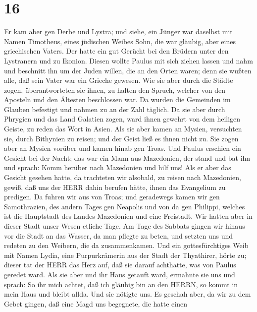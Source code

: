 \hypertarget{section-15}{%
\section{16}\label{section-15}}

 Er kam aber gen Derbe und Lystra; und siehe, ein Jünger war
daselbst mit Namen Timotheus, eines jüdischen Weibes Sohn, die war
gläubig, aber eines griechischen Vaters.  Der hatte ein gut
Gerücht bei den Brüdern unter den Lystranern und zu Ikonion.
 Diesen wollte Paulus mit sich ziehen lassen und nahm und
beschnitt ihn um der Juden willen, die an den Orten waren; denn sie
wußten alle, daß sein Vater war ein Grieche gewesen.  Wie
sie aber durch die Städte zogen, überantworteten sie ihnen, zu halten
den Spruch, welcher von den Aposteln und den Ältesten beschlossen war.
 Da wurden die Gemeinden im Glauben befestigt und nahmen zu
an der Zahl täglich.  Da sie aber durch Phrygien und das
Land Galatien zogen, ward ihnen gewehrt von dem heiligen Geiste, zu
reden das Wort in Asien.  Als sie aber kamen an Mysien,
versuchten sie, durch Bithynien zu reisen; und der Geist ließ es ihnen
nicht zu.  Sie zogen aber an Mysien vorüber und kamen hinab
gen Troas.  Und Paulus erschien ein Gesicht bei der Nacht;
das war ein Mann aus Mazedonien, der stand und bat ihn und sprach: Komm
herüber nach Mazedonien und hilf uns!  Als er aber das
Gesicht gesehen hatte, da trachteten wir alsobald, zu reisen nach
Mazedonien, gewiß, daß uns der HERR dahin berufen hätte, ihnen das
Evangelium zu predigen.  Da fuhren wir aus von Troas; und
geradewegs kamen wir gen Samothrazien, des andern Tages gen Neapolis
 und von da gen Philippi, welches ist die Hauptstadt des
Landes Mazedonien und eine Freistadt. Wir hatten aber in dieser Stadt
unser Wesen etliche Tage.  Am Tage des Sabbats gingen wir
hinaus vor die Stadt an das Wasser, da man pflegte zu beten, und setzten
uns und redeten zu den Weibern, die da zusammenkamen.  Und
ein gottesfürchtiges Weib mit Namen Lydia, eine Purpurkrämerin aus der
Stadt der Thyathirer, hörte zu; dieser tat der HERR das Herz auf, daß
sie darauf achthatte, was von Paulus geredet ward.  Als sie
aber und ihr Haus getauft ward, ermahnte sie uns und sprach: So ihr mich
achtet, daß ich gläubig bin an den HERRN, so kommt in mein Haus und
bleibt allda. Und sie nötigte uns.  Es geschah aber, da wir
zu dem Gebet gingen, daß eine Magd uns begegnete, die hatte einen
